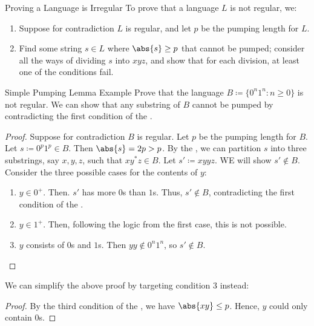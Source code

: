 \documentclass[math]{amznotes}
\begin{document}
\begin{tecbox}{Proving a Language is Irregular}{}
    To prove that a language $L$ is not regular, we:
    \begin{enumerate}
        \item Suppose for contradiction $L$ is regular, and let $p$ be the pumping length for $L$.
        \item Find some string $s \in L$ where $\abs{s} \geq p$ that cannot be pumped; consider all the ways of dividing $s$ into $xyz$, and show that for each division, at least one of the conditions fail.
    \end{enumerate}
\end{tecbox}

\begin{exbox}{Simple Pumping Lemma Example}{}
    Prove that the language $B \coloneq \{ 0^n 1^n : n \geq 0 \}$ is not regular.
    \tcblower
    We can show that any substring of $B$ cannot be pumped by contradicting the first condition of the .
    \begin{proof}
        Suppose for contradiction $B$ is regular. Let $p$ be the pumping length for $B$. Let $s \coloneq 0^p1^p \in B$. Then $\abs{s} = 2p > p$. By the , we can partition $s$ into three substrings, say $x,y,z$, such that $x  y^*  z \in B$. Let $s\prime \coloneq x  y  y  z$. WE will show $s\prime \notin B$. Consider the three possible cases for the contents of $y$:
        \begin{enumerate}
            \item $y \in 0^+$. Then. $s\prime$ has more $0$s than $1$s. Thus, $s\prime \notin B$, contradicting the first condition of the .
            \item $y \in 1^+$. Then, following the logic from the first case, this is not possible.
            \item $y$ consists of $0$s and $1$s. Then $y  y \notin 0^n1^n$, so $s \prime \notin B$.
        \end{enumerate}
    \end{proof}

    We can simplify the above proof by targeting condition 3 instead:
    \begin{proof}
        By the third condition of the , we have $\abs{x  y} \leq p$. Hence, $y$ could only contain $0$s.
    \end{proof}
\end{exbox}
\end{document}
